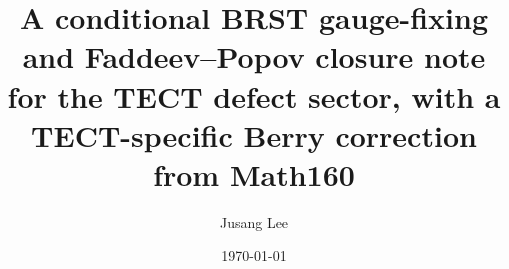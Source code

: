 



\title{A conditional BRST gauge-fixing and Faddeev--Popov closure note
for the TECT defect sector, with a TECT-specific Berry correction
from Math160}

\author{Jusang Lee}

\date{\today}

